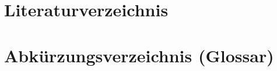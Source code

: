 \documentclass[12pt, a4paper]{report}
\begin{document}
	
	
	
	
	
	\chapter{Literaturverzeichnis}
	
	
	
	
	
	
	\chapter{Abkürzungsverzeichnis (Glossar)}
	
\end{document}
